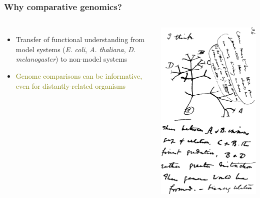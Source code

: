 %
\begin{frame}
  \frametitle{Why comparative genomics?}
    \begin{columns}[c] 
        \begin{itemize}
         \item \textcolor{RawSienna}{Transfer of functional understanding from model systems (\textit{E. coli}, \textit{A. thaliana}, \textit{D. melanogaster}) to non-model systems}
         \item \textcolor{olive}{Genome comparisons can be informative, even for distantly-related organisms}
        \end{itemize}
        \includegraphics[width=\textwidth]{images/darwin_tree}
    \end{columns}  
\end{frame}

